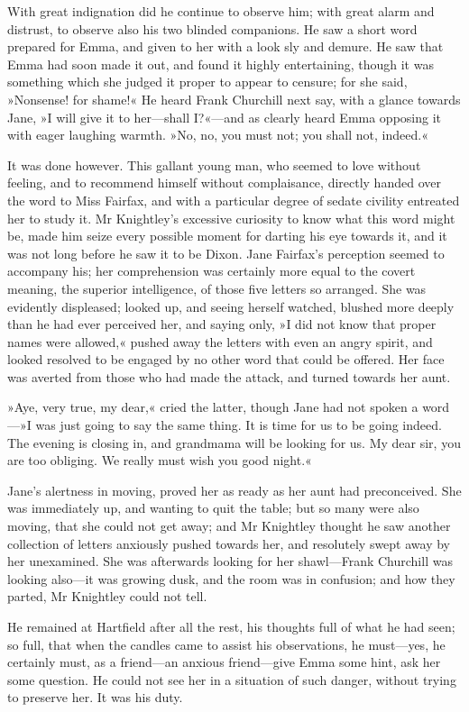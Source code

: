 With great indignation did he continue to observe him; with great alarm and distrust, to observe also his two blinded companions. He saw a short word prepared for Emma, and given to her with a look sly and demure. He saw that Emma had soon made it out, and found it highly entertaining, though it was something which she judged it proper to appear to censure; for she said, »Nonsense! for shame!« He heard Frank Churchill next say, with a glance towards Jane, »I will give it to her—shall I?«—and as clearly heard Emma opposing it with eager laughing warmth. »No, no, you must not; you shall not, indeed.«

It was done however. This gallant young man, who seemed to love without feeling, and to recommend himself without complaisance, directly handed over the word to Miss Fairfax, and with a particular degree of sedate civility entreated her to study it. Mr Knightley's excessive curiosity to know what this word might be, made him seize every possible moment for darting his eye towards it, and it was not long before he saw it to be Dixon. Jane Fairfax's perception seemed to accompany his; her comprehension was certainly more equal to the covert meaning, the superior intelligence, of those five letters so arranged. She was evidently displeased; looked up, and seeing herself watched, blushed more deeply than he had ever perceived her, and saying only, »I did not know that proper names were allowed,« pushed away the letters with even an angry spirit, and looked resolved to be engaged by no other word that could be offered. Her face was averted from those who had made the attack, and turned towards her aunt.

»Aye, very true, my dear,« cried the latter, though Jane had not spoken a word—»I was just going to say the same thing. It is time for us to be going indeed. The evening is closing in, and grandmama will be looking for us. My dear sir, you are too obliging. We really must wish you good night.«

Jane's alertness in moving, proved her as ready as her aunt had preconceived. She was immediately up, and wanting to quit the table; but so many were also moving, that she could not get away; and Mr Knightley thought he saw another collection of letters anxiously pushed towards her, and resolutely swept away by her unexamined. She was afterwards looking for her shawl—Frank Churchill was looking also—it was growing dusk, and the room was in confusion; and how they parted, Mr Knightley could not tell.

He remained at Hartfield after all the rest, his thoughts full of what he had seen; so full, that when the candles came to assist his observations, he must—yes, he certainly must, as a friend—an anxious friend—give Emma some hint, ask her some question. He could not see her in a situation of such danger, without trying to preserve her. It was his duty.


